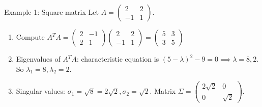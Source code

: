 \documentclass[aspectratio=169]{beamer}\usepackage[]{graphicx}\usepackage[]{xcolor}
\begin{document}
\begin{frame}{Example 1: Square matrix}
Let $A = \begin{pmatrix} 2 & 2 \\ -1 & 1 \end{pmatrix}$.
\vfill
\begin{enumerate}
\item Compute $A^TA = \begin{pmatrix} 2 & -1 \\ 2 & 1 \end{pmatrix}\begin{pmatrix} 2 & 2 \\ -1 & 1 \end{pmatrix} = \begin{pmatrix} 5 & 3 \\ 3 & 5 \end{pmatrix}$
\item Eigenvalues of $A^TA$: characteristic equation is $(5-\lambda)^2 - 9 = 0 \implies \lambda = 8, 2$. So $\lambda_1=8, \lambda_2=2$.
\item Singular values: $\sigma_1=\sqrt{8}=2\sqrt{2}, \sigma_2=\sqrt{2}$. Matrix $\Sigma = \begin{pmatrix} 2\sqrt{2} & 0 \\ 0 & \sqrt{2} \end{pmatrix}$.
\end{enumerate}
\end{frame}
\end{document}
